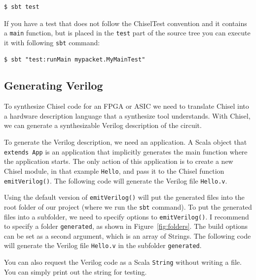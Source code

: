 \documentclass[%
    10pt,
    headinclude, footexclude,
    openright, %
    notitlepage,
    cleardoubleempty,
    headsepline,
    pointlessnumbers,
    bibtotoc, idxtotoc,
    ]{scrbook}
\newcommand{\code}[1]{{\small{\texttt{#1}}}}
\begin{document}
\begin{verbatim}
$ sbt test
\end{verbatim}

If you have a test that does not follow the ChiselTest convention and it contains a \code{main}
function, but is placed in the \code{test} part of the source tree you can execute it
with following \code{sbt} command:

\begin{verbatim}
$ sbt "test:runMain mypacket.MyMainTest"
\end{verbatim}

\subsection{Generating Verilog}


To synthesize Chisel code for an FPGA or ASIC we need to translate Chisel into
a hardware description language that a synthesize tool understands.
With Chisel, we can generate a synthesizable Verilog description of the circuit.

To generate the Verilog description, we need an application. A Scala object that \code{extends App}
is an application that implicitly generates the main function where the application starts.
The only action of this application is to create a new Chisel module, in that example \code{Hello},
and pass it to the Chisel function \code{emitVerilog()}.
The following code will generate the Verilog file \code{Hello.v}.


Using the default version of \code{emitVerilog()} will put the generated files
into the root folder of our project (where we run the \code{sbt} command).
To put the generated files into a subfolder, we need to specify options to \code{emitVerilog()}.
I recommend to specify a folder \code{generated}, as shown in Figure~\ref{fig:folders}.
The build options can be set as a second argument, which is an array of Strings.
The following code will generate the Verilog file \code{Hello.v} in the subfolder \code{generated}.


You can also request the Verilog code as a Scala \code{String} without writing a file.
You can simply print out the string for testing.

\end{document}
